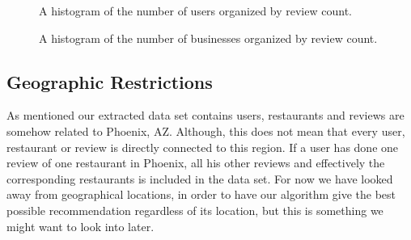 \documentclass[10pt,twocolumn,letterpaper]{article}
\begin{document}
\begin{figure}[t]
\begin{center}
\end{center}
   \caption{A histogram of the number of users organized by review count.}
\label{fig:usrCnt}
\end{figure}

\begin{figure}[t]
\begin{center}
\end{center}
   \caption{A histogram of the number of businesses organized by review count.}
\label{fig:bizCnt}
\end{figure}

\subsection{Geographic Restrictions}
As mentioned our extracted data set contains users, restaurants and reviews are somehow related to Phoenix, AZ. Although, this does not mean that every user, restaurant or review is directly connected to this region. If a user has done one review of one restaurant in Phoenix, all his other reviews and effectively the corresponding restaurants is included in the data set. For now we have looked away from geographical locations, in order to have our algorithm give the best possible recommendation regardless of its location, but this is something we might want to look into later.
\end{document}
